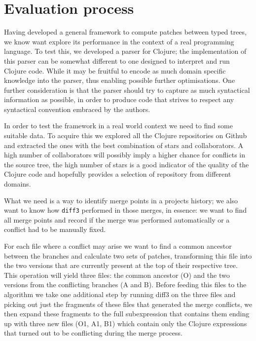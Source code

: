 \documentclass[11pt]{article}
\begin{document}
\section{Evaluation process}

Having developed a general framework to compute patches between typed trees, 
we know want explore its performance in the context of a real programming language.
To test this, we developed a parser for Clojure; the implementation of this parser can be somewhat 
different to one designed to interpret and run Clojure code. While it may 
be fruitful to encode as much domain specific knowledge into the parser, thus 
enabling possible further optimisations. One further consideration is that the parser should try to 
capture as much syntactical information as possible, in order to produce code 
that strives to respect any syntactical convention embraced by the authors.

In order to test the framework in a real world context we need to find some suitable data. To acquire this 
we explored all the Clojure repositories on Github and extracted the ones with the best combination of 
stars and collaborators. A high number of collaborators will possibly imply a higher chance for conflicts in
the source tree, the high number of stars is a good indicator of the quality of 
the Clojure code and hopefully provides a selection of repository from different 
domains.

What we need is a way to identify merge points in a projects history; we also 
want to know how \texttt{diff3} performed in those merges, in essence: we want to find all 
merge points and record if the merge was performed automatically or a conflict 
had to be manually fixed.

For each file where a conflict may arise we want to find a common ancestor 
between the branches and calculate two sets of patches, transforming this file 
into the two versions that are currently present at the top of their respective 
tree. This operation will yield three files: the common ancestor (O) and the two 
versions from the conflicting branches (A and B). Before feeding this files to 
the algorithm we take one additional step by running diff3 on the three files 
and picking out just the fragments of these files that generated the merge 
conflicts, we then expand these fragments to the full subexpression that 
contains them ending up with three new files (O1, A1, B1) which contain only the 
Clojure expressions that turned out to be conflicting during the merge process.
\end{document}
